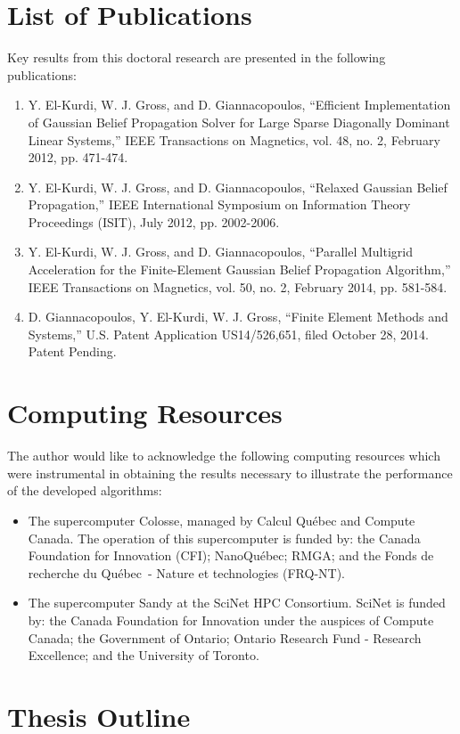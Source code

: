 \section{List of Publications}
Key results from this doctoral research are presented in the following publications:
\begin{enumerate}
	\item Y. El-Kurdi, W. J. Gross, and D. Giannacopoulos, ``Efficient Implementation of Gaussian Belief Propagation Solver for Large Sparse Diagonally Dominant Linear Systems,'' IEEE Transactions on Magnetics, vol. 48, no. 2, February 2012, pp. 471-474. 
	\item Y. El-Kurdi, W. J. Gross, and D. Giannacopoulos, ``Relaxed Gaussian Belief Propagation,'' IEEE International Symposium on Information Theory Proceedings (ISIT), July 2012, pp. 2002-2006.
	\item Y. El-Kurdi, W. J. Gross, and D. Giannacopoulos, ``Parallel Multigrid Acceleration for the Finite-Element Gaussian Belief Propagation Algorithm,'' IEEE Transactions on Magnetics, vol. 50, no. 2, February 2014, pp. 581-584.
	\item D. Giannacopoulos, Y. El-Kurdi, W. J. Gross, ``Finite Element Methods and Systems,'' U.S. Patent Application US14/526,651, filed October 28, 2014. Patent Pending.
\end{enumerate}


\section{Computing Resources}
The author would like to acknowledge the following computing resources which were instrumental in obtaining the results necessary to illustrate the performance of the developed algorithms:
\begin{itemize}
	\item The supercomputer Colosse, managed by Calcul Qu\'ebec and Compute Canada.
		The operation of this supercomputer is funded by: the Canada Foundation for Innovation (CFI); NanoQu\'ebec; RMGA; and the Fonds de recherche du Qu\'ebec~- Nature et technologies (FRQ-NT).
	\item The supercomputer Sandy at the SciNet HPC Consortium.
		SciNet is funded by: the Canada Foundation for Innovation under the auspices of Compute Canada; the Government of Ontario; Ontario Research Fund - Research Excellence; and the University of Toronto.
\end{itemize}


\section{Thesis Outline}

